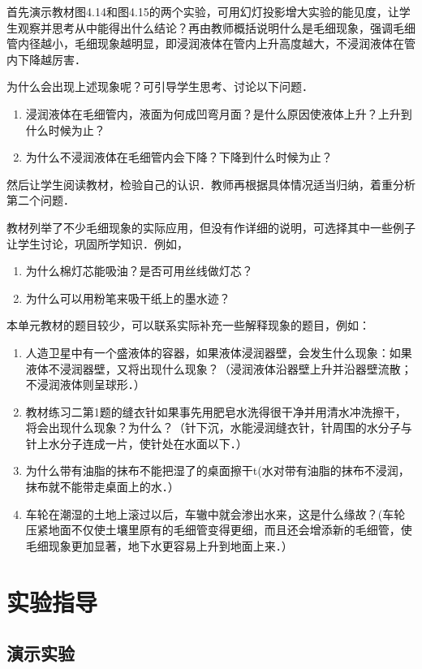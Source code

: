 首先演示教材图4.14和图4.15的两个实验，可用幻灯投影增大实验的能见度，让学生观察并思考从中能得出什么结论？再由教师概括说明什么是毛细现象，强调毛细管内径越小，毛细现象越明显，即浸润液体在管内上升高度越大，不浸润液体在管内下降越厉害．

为什么会出现上述现象呢？可引导学生思考、讨论以下问题．
\begin{enumerate}
    \item 浸润液体在毛细管内，液面为何成凹弯月面？是什么原因使液体上升？上升到什么时候为止？
\item 为什么不浸润液体在毛细管内会下降？下降到什么时候为止？
\end{enumerate}
然后让学生阅读教材，检验自己的认识．教师再根据具体情况适当归纳，着重分析第二个问题．

教材列举了不少毛细现象的实际应用，但没有作详细的说明，可选择其中一些例子让学生讨论，巩固所学知识．例如，
\begin{enumerate}
    \item 为什么棉灯芯能吸油？是否可用丝线做灯芯？    \item 为什么可以用粉笔来吸干纸上的墨水迹？
\end{enumerate}

本单元教材的题目较少，可以联系实际补充一些解释现象的题目，例如：
\begin{enumerate}
\item 人造卫星中有一个盛液体的容器，如果液体浸润器壁，会发生什么现象：如果液体不浸润器壁，又将出现什么现象？（浸润液体沿器壁上升并沿器壁流散；不浸润液体则呈球形．）
\item 教材练习二第1题的缝衣针如果事先用肥皂水洗得很干净并用清水冲洗擦干，将会出现什么现象？为什么？（针下沉，水能浸润缝衣针，针周围的水分子与针上水分子连成一片，使针处在水面以下．）
\item 为什么带有油脂的抹布不能把湿了的桌面擦干t(水对带有油脂的抹布不浸润，抹布就不能带走桌面上的水．）
\item 车轮在潮湿的土地上滚过以后，车辙中就会渗出水来，这是什么缘故？(车轮压紧地面不仅使土壤里原有的毛细管变得更细，而且还会增添新的毛细管，使毛细现象更加显著，地下水更容易上升到地面上来．）
\end{enumerate}

\section{实验指导}
\subsection{演示实验}
